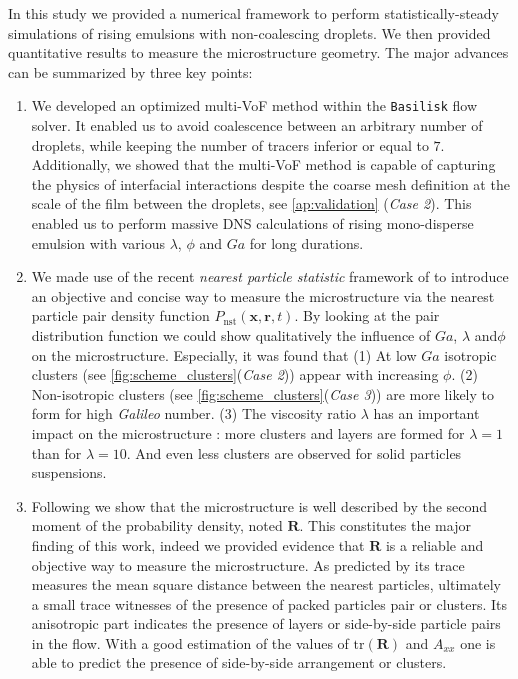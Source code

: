 
In this study we provided a numerical framework to perform statistically-steady simulations of rising emulsions with non-coalescing droplets. 
We then provided quantitative results to measure the microstructure geometry.
The major advances can be summarized by three key points:
\begin{enumerate}
    \item We developed an optimized multi-VoF method within the \texttt{Basilisk} flow solver. 
    It enabled us to avoid coalescence between an arbitrary number of droplets, while keeping the number of tracers inferior or equal to $7$. 
    Additionally, we showed that the multi-VoF method is capable of capturing the physics of interfacial interactions despite the coarse mesh definition at the scale of the film between the droplets, see \ref{ap:validation} (\textit{Case 2}). 
    This enabled us to perform massive DNS calculations of rising mono-disperse emulsion with various $\lambda$, $\phi$ and $Ga$ for long durations.
    \item We made use of the recent \textit{nearest particle statistic} framework of \citet{zhang2023evolution} to introduce an objective and concise way to measure the microstructure via the nearest particle pair density function $P_\text{nst}(\textbf{x},\textbf{r},t)$. 
    By looking at the pair distribution function we could show qualitatively the influence of $Ga$, $\lambda$ and$\phi$ on the microstructure.
    Especially, it was found that 
    (1) At low $Ga$ isotropic clusters (see \ref{fig:scheme_clusters}(\textit{Case 2})) appear with increasing $\phi$. 
    (2) Non-isotropic clusters (see \ref{fig:scheme_clusters}(\textit{Case 3})) are more likely to form for high \textit{Galileo} number.
    (3) The viscosity ratio $\lambda$ has an important impact on the microstructure : more clusters and layers are formed for $\lambda = 1$ than for $\lambda = 10$. 
    And even less clusters are observed for solid particles suspensions. 
    \item Following \citet{zhang2023evolution} we show that the microstructure is well described by the second moment of the probability density, noted $\textbf{R}$. 
    This constitutes the major finding of this work, indeed we provided evidence that $\textbf{R}$ is a reliable and objective way to measure the microstructure.
    As predicted by \citet{zhang2023evolution} its trace measures the mean square distance between the nearest particles, ultimately a small trace witnesses of the presence of packed particles pair or clusters.
    Its anisotropic part indicates the presence of layers or side-by-side particle pairs in the flow. 
    With a good estimation of the values of $\text{tr}(\textbf{R})$ and $A_{xx}$ one is able to predict the presence of side-by-side arrangement or clusters.
\end{enumerate}
